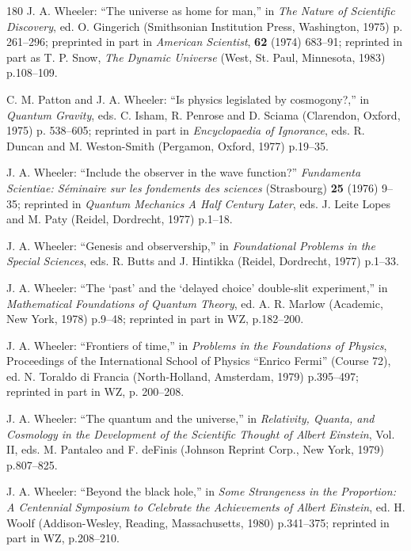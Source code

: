 \documentclass[11pt]{article}
\begin{document}
\begin{thebibliography}{180}
		J. A. Wheeler: ``The universe as home for man,'' in \emph{The Nature of Scientific Discovery}, ed. O. Gingerich (Smithsonian Institution Press, Washington, 1975) p. 261--296; preprinted in part in \emph{American Scientist}, \textbf{62} (1974) 683--91; reprinted in part as T. P. Snow, \emph{The Dynamic Universe} (West, St. Paul, Minnesota, 1983) p.108--109.
		
		C. M. Patton and J. A. Wheeler: ``Is physics legislated by cosmogony?,'' in \emph{Quantum Gravity}, eds. C. Isham, R. Penrose and D. Sciama (Clarendon, Oxford, 1975) p. 538--605; reprinted in part in \emph{Encyclopaedia of Ignorance}, eds. R. Duncan and M. Weston-Smith (Pergamon, Oxford, 1977) p.19--35.
		
		J. A. Wheeler: ``Include the observer in the wave function?'' \emph{Fundamenta Scientiae: S\'eminaire sur les fondements des sciences} (Strasbourg) \textbf{25} (1976) 9--35; reprinted in \emph{Quantum Mechanics A Half Century Later}, eds. J. Leite Lopes and M. Paty (Reidel, Dordrecht, 1977) p.1--18.
		
		J. A. Wheeler: ``Genesis and observership,'' in \emph{Foundational Problems in the Special Sciences}, eds. R. Butts and J. Hintikka (Reidel, Dordrecht, 1977) p.1--33.
		
		J. A. Wheeler: ``The `past' and the `delayed choice' double-slit experiment,'' in \emph{Mathematical Foundations of Quantum Theory}, ed. A. R. Marlow (Academic, New York, 1978) p.9--48; reprinted in part in WZ, p.182--200.
		
		J. A. Wheeler: ``Frontiers of time,'' in \emph{Problems in the Foundations of Physics}, Proceedings of the International School of Physics ``Enrico Fermi'' (Course 72), ed. N. Toraldo di Francia (North-Holland, Amsterdam, 1979) p.395--497; reprinted in part in WZ, p. 200--208.
		
		J. A. Wheeler: ``The quantum and the universe,'' in \emph{Relativity, Quanta, and Cosmology in the Development of the Scientific Thought of Albert Einstein}, Vol. II, eds. M. Pantaleo and F. deFinis (Johnson Reprint Corp., New York, 1979) p.807--825.
		
		J. A. Wheeler: ``Beyond the black hole,'' in \emph{Some Strangeness in the Proportion: A Centennial Symposium to Celebrate the Achievements of Albert Einstein}, ed. H. Woolf (Addison-Wesley, Reading, Massachusetts, 1980) p.341--375; reprinted in part in WZ, p.208--210.
		

\end{thebibliography}
\end{document}
